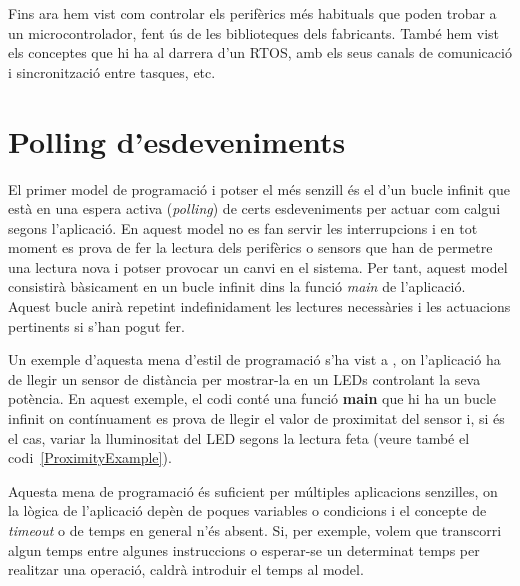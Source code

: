 



Fins ara hem vist com controlar els perifèrics més habituals que poden trobar a un microcontrolador, fent ús de les biblioteques dels fabricants. També hem vist els conceptes que hi ha al darrera d'un RTOS, amb els seus canals de comunicació i sincronització entre tasques, etc.

\chapter{Polling d'esdeveniments}
El primer model de programació i potser el més senzill és el d'un bucle infinit que està en una espera activa ({\em polling}) de certs esdeveniments per actuar com calgui segons l'aplicació. En aquest model no es fan servir les interrupcions i en tot moment es prova de fer la lectura dels perifèrics o sensors que han de permetre una lectura nova i potser provocar un canvi en el sistema. Per tant, aquest model consistirà bàsicament en un bucle infinit dins la funció {\em main} de l'aplicació. Aquest bucle anirà repetint indefinidament les lectures necessàries i les actuacions pertinents si s'han pogut fer.

Un exemple d'aquesta mena d'estil de programació s'ha vist a , on l'aplicació ha de llegir un sensor de distància per mostrar-la en un LEDs controlant la seva potència. En aquest exemple, el codi conté una funció {\bf main} que hi ha un bucle infinit on contínuament es prova de llegir el valor de proximitat del sensor i, si és el cas, variar la lluminositat del LED segons la lectura feta (veure també el codi~\ref{ProximityExample}).

Aquesta mena de programació és suficient per múltiples aplicacions senzilles, on la lògica de l'aplicació depèn de poques variables o condicions i el concepte de {\em timeout} o de temps en general n'és absent. Si, per exemple, volem que transcorri algun temps entre algunes instruccions o esperar-se un determinat temps per realitzar una operació, caldrà introduir el temps al model.

